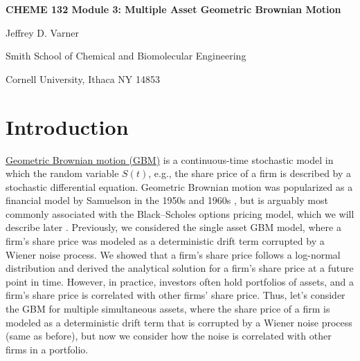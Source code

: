 \documentclass[11pt]{article}
\theoremstyle{definition}
\begin{document}
{\par\centering\textbf{\Large CHEME 132 Module 3: Multiple Asset Geometric Brownian Motion}}
\vspace{0.2in}
{\par \centering \large{Jeffrey D. Varner}}
\vspace{0.05in}
{\par \centering \large{Smith School of Chemical and Biomolecular Engineering}}
{\par \centering \large{Cornell University, Ithaca NY 14853}}

\date{}
\thispagestyle{empty}

\setcounter{page}{1}

\section*{Introduction}
\href{https://en.wikipedia.org/wiki/Geometric_Brownian_motion}{Geometric Brownian motion (GBM)} is a continuous-time stochastic model in which the random variable $S(t)$, 
e.g., the share price of a firm is described by a stochastic differential equation.
Geometric Brownian motion was popularized as a financial model by Samuelson in the 1950s and 1960s \cite{Merton2006}, 
but is arguably most commonly associated with the Black–Scholes options pricing model, which we will describe later 
\cite{BlackScholes1973}. Previously, we considered the single asset GBM model, 
where a firm's share price was modeled as a deterministic drift term corrupted by a Wiener noise process. 
We showed that a firm's share price follows a log-normal distribution and derived the analytical solution for a firm's share price at a future point in time.
However, in practice, investors often hold portfolios of assets, and a firm's share price is correlated with other firms' share price.
Thus, let's consider the GBM for multiple simultaneous assets, where the share price of a firm is modeled as a deterministic drift term 
that is corrupted by a Wiener noise process (same as before), but now we consider how the noise is correlated with other firms in a portfolio.
\end{document}
